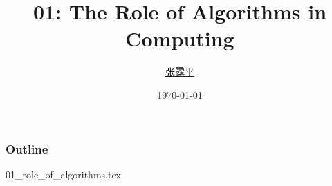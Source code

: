 \documentclass{beamer}
\title{01: The Role of Algorithms in Computing}
\author{\href{mailto:zlp@upc.edu.cn}{张露平}}
\date{\today}
\begin{document}
\maketitle

\begin{frame}
    \frametitle{Outline}

    \tableofcontents

\end{frame}

{01_role_of_algorithms.tex}

\backmatter
\end{document}
